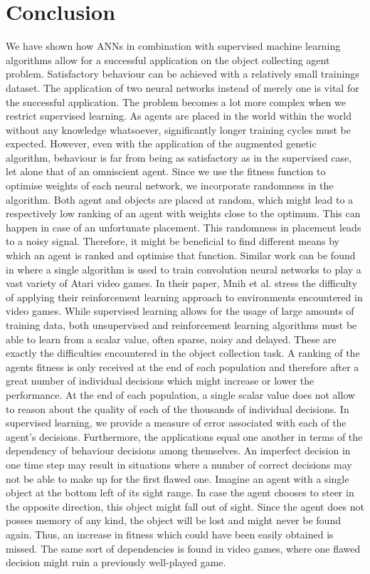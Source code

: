 \documentclass[10pt,a4paper,DIV=11]{scrreprt}
\begin{document}
\chapter{Conclusion}
\label{ch:conclusion}
We have shown how ANNs in combination with supervised machine learning algorithms allow for a successful application on the
object collecting agent problem. Satisfactory behaviour can be achieved with a relatively small trainings dataset. The application of two neural
networks instead of merely one is vital for the successful application. The problem becomes a lot more complex when we restrict supervised learning. As 
agents are placed in the world within the world without any knowledge whatsoever, significantly longer training cycles must be expected. However, 
even with the application of the augmented genetic algorithm, behaviour is far from being as satisfactory as in the supervised case, let alone that
of an omniscient agent. Since we use the fitness function to optimise weights of each neural network, we incorporate randomness in the algorithm. 
Both agent and objects are placed at random, which might lead to a respectively low ranking of an agent with weights close to the optimum. This can 
happen in case of an unfortunate placement. This randomness in placement leads to a noisy signal. Therefore, it might be beneficial to find different means by which an agent is ranked and optimise that
function. Similar work can be found in \cite{DEEPMIND} where a single algorithm is used to train convolution neural networks to play a 
vast variety of Atari video games. In their paper, Mnih et al. stress the difficulty of applying their reinforcement learning approach to environments
encountered in video games. While supervised learning allows for the usage of large amounts of training data, both unsupervised and reinforcement
learning algorithms must be able to learn from a scalar value, often sparse, noisy and delayed. These are exactly the difficulties encountered in
the object collection task. A ranking of the agents fitness is only received at the end of each population and therefore after a great number of
individual decisions which might increase or lower the performance. At the end of each population, a single scalar value does not allow to reason 
about the quality of each of the thousands of individual decisions. In supervised learning, we provide a measure of error associated with each 
of the agent's decisions. Furthermore, the applications equal one another in terms of the dependency of behaviour decisions among themselves. 
An imperfect decision in one time step may result in situations where a number of correct decisions may not be able to make up for the first flawed 
one. Imagine an agent with a single object at the bottom left of its sight range. In case the agent chooses to steer in the opposite direction,
this object might fall out of sight. Since the agent does not posses memory of any kind, the object will be lost and might never be found again.
Thus, an increase in fitness which could have been easily obtained is missed. The same sort of dependencies is found in video games, where one
flawed decision might ruin a previously well-played game.
\end{document}
